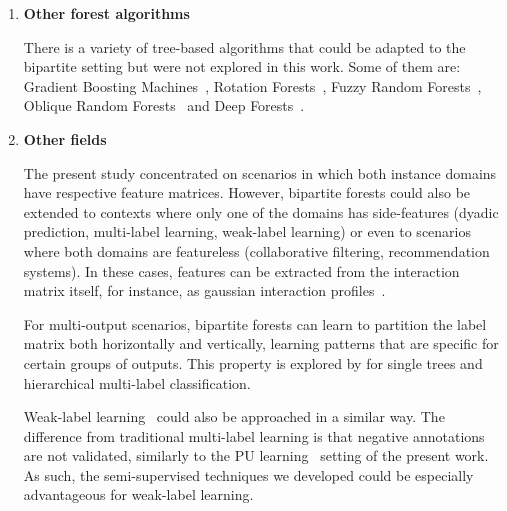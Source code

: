 \begin{enumerate}



    \item \textbf{Other forest algorithms}

    There is a variety of tree-based algorithms that could be adapted to the bipartite setting but were not explored in this work. Some of them are: Gradient Boosting Machines~\cite{natekin2013gradient,chen2016xgboost}, Rotation Forests~\cite{rodriguez2006rotation}, Fuzzy Random Forests~\cite{bonissone2010fuzzy}, Oblique Random Forests~\cite{breiman2001random} and Deep Forests~\cite{zhou2019deep}.

    \item \textbf{Other fields}

    The present study concentrated on scenarios in which both instance domains have respective feature matrices. However, bipartite forests could also be extended to contexts where only one of the domains has side-features (dyadic prediction, multi-label learning, weak-label learning) or even to scenarios where both domains are featureless (collaborative filtering, recommendation systems).
    In these cases, features can be extracted from the interaction matrix itself, for instance, as gaussian interaction profiles~\cite{vanlaarhoven2011gaussian}.

    For multi-output scenarios, bipartite forests 
    can learn to partition the label matrix both horizontally and vertically, learning patterns that are specific for certain groups of outputs. This property is explored by \cite{santos2021predictive} for single trees and hierarchical multi-label classification.

    Weak-label learning~\cite{zhou2018brief,wang2020learning} could also be approached in a similar way. The difference from traditional multi-label learning is that negative annotations are not validated, similarly to the PU learning~\cite{bekker2020learning} setting of the present work. As such, the semi-supervised techniques we developed could be especially advantageous for weak-label learning.


\end{enumerate}
